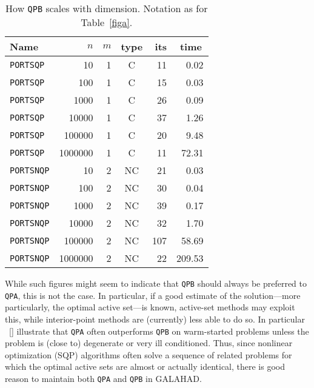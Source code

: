 \documentclass[acmtocl,acmnow]{acmtrans2m}
\newcommand{\gal}{{\sf GALAHAD}}
\newcommand{\citebb}[1]{\citeauthor{#1}\ [\citeyear{#1}]}
\begin{document}
\begin{table}[htb]
\begin{center}
\begin{tabular}[c]{|lrrc|rr|}
\hline
Name      & $n$ & $m$ & type & its & time\, \\
\hline
{\tt PORTSQP}  & 10 & 1  & C & 11    & {0.02} \\
{\tt PORTSQP}  & 100 & 1  & C &  15   & {0.03} \\
{\tt PORTSQP}  & 1000 & 1  & C &  26   & {0.09} \\
{\tt PORTSQP}  & 10000 & 1  & C &  37   & {1.26} \\
{\tt PORTSQP}  & 100000 & 1  & C &  20   & {9.48} \\
{\tt PORTSQP}  & 1000000 & 1  & C &  11   & {72.31} \\
\hline
{\tt PORTSNQP}  & 10 & 2  & NC & 21    & {0.03} \\
{\tt PORTSNQP}  & 100 & 2  & NC &  30   & {0.04} \\
{\tt PORTSNQP}  & 1000 & 2  & NC &  39   & {0.17} \\
{\tt PORTSNQP}  & 10000 & 2  & NC &  32   & {1.70} \\
{\tt PORTSNQP}  & 100000 & 2  & NC &  107   & { 58.69} \\
{\tt PORTSNQP}  & 1000000 & 2  & NC &  22   & {209.53} \\
\hline
\end{tabular}
\end{center}
\caption{\label{figb} How {\tt QPB} scales with dimension.
Notation as for Table~\ref{figa}.}
\end{table}

While such figures might seem to indicate that {\tt QPB} should always
be preferred to {\tt QPA}, this is not the case. In particular, if a
good estimate of the solution---more particularly, the optimal active 
set---is known, active-set methods may exploit this, 
while interior-point methods
are (currently) less able to do so. In particular
\citebb{GoulToin01c} illustrate that {\tt QPA} often outperforms {\tt QPB}
on warm-started problems unless the problem is (close to) degenerate or
very ill conditioned. Thus, since nonlinear optimization (SQP) algorithms 
often solve a sequence of related problems for which the optimal active sets
are almost or actually identical, there is good reason to maintain both
{\tt QPA} and {\tt QPB} in \gal.
\end{document}

